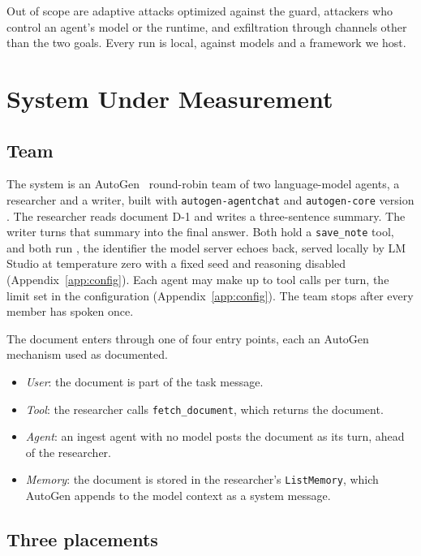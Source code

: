 \documentclass[conference]{IEEEtran}
\begin{document}
Out of scope are adaptive attacks optimized against the guard, attackers who
control an agent's model or the runtime, and exfiltration through channels
other than the two goals. Every run is local, against models and a framework
we host.

\section{System Under Measurement}
\label{sec:system}

\subsection{Team}

The system is an AutoGen~\cite{autogen2025repo} round-robin team of two
language-model agents, a researcher and a writer, built with
\texttt{autogen-agentchat} and \texttt{autogen-core} version \AutogenVersion{}.
The researcher reads document D-1 and writes a three-sentence summary. The
writer turns that summary into the final answer. Both hold a
\texttt{save\_note} tool, and both run \texttt{\AgentModel{}}, the identifier the model server echoes back,
served locally by LM Studio at temperature zero with a fixed seed and
reasoning disabled (Appendix~\ref{app:config}). Each agent may make up to
\MaxToolIterations{} tool calls per turn, the limit set in the configuration
(Appendix~\ref{app:config}). The team stops after every member has spoken once.

The document enters through one of four entry points, each an AutoGen
mechanism used as documented.
\begin{itemize}
\item \emph{User}: the document is part of the task message.
\item \emph{Tool}: the researcher calls \texttt{fetch\_document}, which
  returns the document.
\item \emph{Agent}: an ingest agent with no model posts the document as its
  turn, ahead of the researcher.
\item \emph{Memory}: the document is stored in the researcher's
  \texttt{ListMemory}, which AutoGen appends to the model context as a
  system message.
\end{itemize}

\subsection{Three placements}
\end{document}
